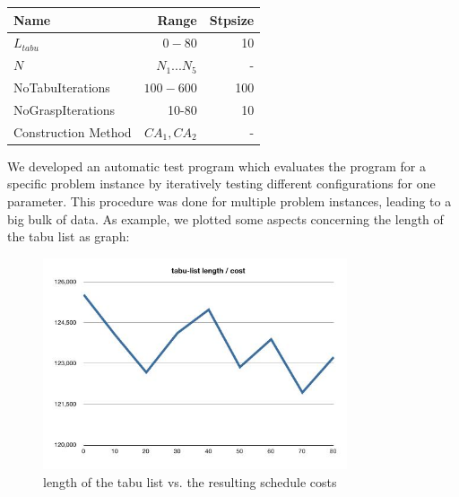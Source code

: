\documentclass[a4paper,11pt]{article}
\begin{document}
\begin{center}
\begin{tabular}{| l | r |r | }
  \hline                       
  Name & Range & Stpsize \\   \hline     \hline    
  $L_{tabu}$ &  $0-80$& 10\\ \hline    
  $N$ &  $N_1 ... N_5$ & -\\ \hline   
  NoTabuIterations & $100-600$  & 100 \\ \hline  
  NoGraspIterations &  10-80 & 10  \\ \hline 
  Construction Method &  $CA_1, CA_2 $& - \\ \hline 

\end{tabular}
\end{center}

We developed an automatic test program which evaluates the program for a specific problem instance 
by iteratively testing different configurations for one parameter. This procedure was done for multiple problem instances, leading to a big bulk of data.
As example, we plotted some aspects concerning the length of the tabu list as graph:

\begin{figure}[htb]
  \begin{center}
    \includegraphics[width=0.8\textwidth]{images/tabulist-len-cost}
  \end{center}
  \caption{length of the tabu list vs. the resulting schedule costs}
  \label{fig:tabu_len_cost}
\end{figure}
\end{document}
